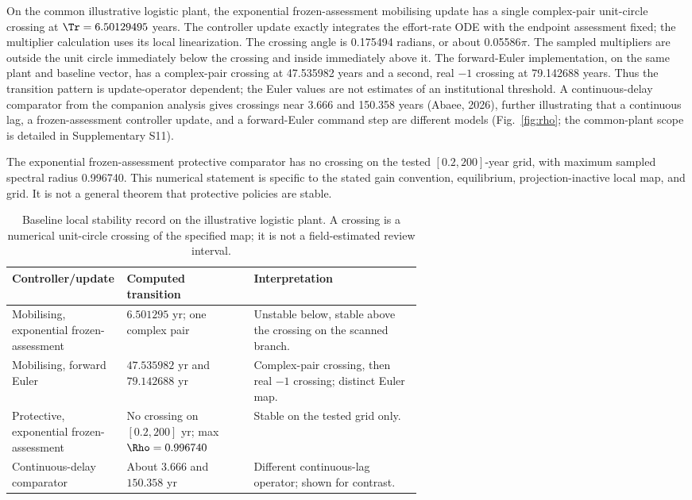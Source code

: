 On the common illustrative logistic plant, the exponential frozen-assessment mobilising update has a single complex-pair unit-circle crossing at \(\Tr=6.50129495\) years. The controller update exactly integrates the effort-rate ODE with the endpoint assessment fixed; the multiplier calculation uses its local linearization. The crossing angle is 0.175494 radians, or about 0.05586\(\pi\). The sampled multipliers are outside the unit circle immediately below the crossing and inside immediately above it. The forward-Euler implementation, on the same plant and baseline vector, has a complex-pair crossing at 47.535982 years and a second, real \(-1\) crossing at 79.142688 years. Thus the transition pattern is update-operator dependent; the Euler values are not estimates of an institutional threshold. A continuous-delay comparator from the companion analysis gives crossings near 3.666 and 150.358 years (Abaee, 2026), further illustrating that a continuous lag, a frozen-assessment controller update, and a forward-Euler command step are different models (Fig.~\ref{fig:rho}; the common-plant scope is detailed in Supplementary S11).

The exponential frozen-assessment protective comparator has no crossing on the tested \([0.2,200]\)-year grid, with maximum sampled spectral radius 0.996740. This numerical statement is specific to the stated gain convention, equilibrium, projection-inactive local map, and grid. It is not a general theorem that protective policies are stable.

\begin{table}[htbp]
\centering\small
\caption{Baseline local stability record on the illustrative logistic plant. A crossing is a numerical unit-circle crossing of the specified map; it is not a field-estimated review interval.}
\label{tab:crossings}
\begin{tabularx}{\linewidth}{@{}p{0.29\linewidth}p{0.31\linewidth}X@{}}
\toprule
Controller/update & Computed transition & Interpretation \\
\midrule
Mobilising, exponential frozen-assessment & \(6.501295\) yr; one complex pair & Unstable below, stable above the crossing on the scanned branch. \\
Mobilising, forward Euler & \(47.535982\) yr and \(79.142688\) yr & Complex-pair crossing, then real \(-1\) crossing; distinct Euler map. \\
Protective, exponential frozen-assessment & No crossing on \([0.2,200]\) yr; max \(\Rho=0.996740\) & Stable on the tested grid only. \\
Continuous-delay comparator & About \(3.666\) and \(150.358\) yr & Different continuous-lag operator; shown for contrast. \\
\bottomrule
\end{tabularx}
\end{table}

